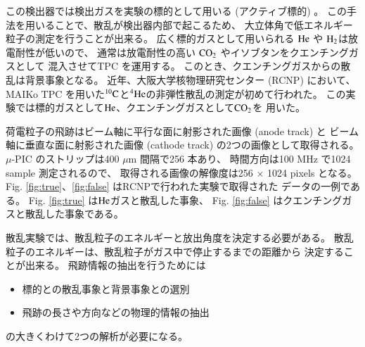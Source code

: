 \documentclass{jps-cp}
\begin{document}
この検出器では検出ガスを実験の標的として用いる (アクティブ標的) 。
この手法を用いることで、散乱が検出器内部で起こるため、
大立体角で低エネルギー粒子の測定を行うことが出来る。
広く標的ガスとして用いられる $\rm{He}$ や $\rm{H}_{2}$は放電耐性が低いので、
通常は放電耐性の高い $\rm{CO}_{2}$ やイソブタンをクエンチングガスとして
混入させてTPC を運用する。
このとき、クエンチングガスからの散乱は背景事象となる。
近年、大阪大学核物理研究センター (RCNP) において、
MAIKo TPC を用いた${}^{10}\rm{C}$と${}^{4}\rm{He}$の非弾性散乱の測定が初めて行われた。
この実験では標的ガスとして$\rm{He}$、クエンチングガスとして$\rm{CO}_{2}$を
用いた。

荷電粒子の飛跡はビーム軸に平行な面に射影された画像 (anode track) と
ビーム軸に垂直な面に射影された画像 (cathode track) の2つの画像として取得される。
$\mu$-PIC のストリップは400 $\mu$m 間隔で256 本あり、
時間方向は100 MHz で1024 sample 測定されるので、
取得される画像の解像度は256 $\times$ 1024 pixels となる。
Fig. \ref{fig:true}、\ref{fig:false} はRCNPで行われた実験で取得された
データの一例である。
Fig. \ref{fig:true} は$\rm{He}$ガスと散乱した事象、
Fig. \ref{fig:false} はクエンチングガスと散乱した事象である。

散乱実験では、散乱粒子のエネルギーと放出角度を決定する必要がある。
散乱粒子のエネルギーは、散乱粒子がガス中で停止するまでの距離から
決定することが出来る。
飛跡情報の抽出を行うためには
\begin{itemize}
\item 標的との散乱事象と背景事象との選別
\item 飛跡の長さや方向などの物理的情報の抽出
\end{itemize}
の大きくわけて2つの解析が必要になる。
\end{document}
